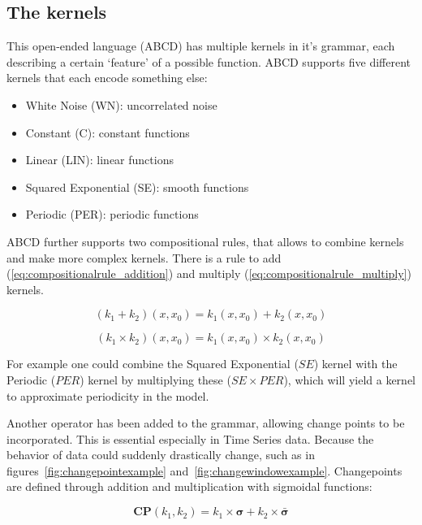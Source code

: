 \documentclass[a4paper, 10pt, conference]{ieeeconf}
\begin{document}
\subsection{The kernels}
\label{subsec:as:kernels}
This open-ended language (ABCD) has multiple kernels in it's grammar, each describing a certain `feature' of a possible function. ABCD supports five different kernels that each encode something else:
\begin{itemize}
    \item White Noise (WN): uncorrelated noise
    \item Constant (C): constant functions
    \item Linear (LIN): linear functions
    \item Squared Exponential (SE): smooth functions
    \item Periodic (PER): periodic functions
\end{itemize}

ABCD further supports two compositional rules, that allows to combine kernels and make more complex kernels. There is a rule to add (\ref{eq:compositionalrule_addition}) and multiply (\ref{eq:compositionalrule_multiply}) kernels.

\begin{equation}
    \label{eq:compositionalrule_addition}
    (k_1 + k_2)(x, x_0) = k_1(x, x_0) + k_2(x, x_0)
\end{equation}

\begin{equation}
    \label{eq:compositionalrule_multiply}
    (k_1 \times k_2)(x, x_0) = k_1(x, x_0) \times k_2(x, x_0)
\end{equation}

For example one could combine the Squared Exponential ($SE$) kernel with the Periodic ($PER$) kernel by multiplying these ($SE \times PER$), which will yield a kernel to approximate periodicity in the model.

Another operator has been added to the grammar, allowing change points to be incorporated. This is essential especially in Time Series data. Because the behavior of data could suddenly drastically change, such as in figures~\ref{fig:changepointexample} and~\ref{fig:changewindowexample}.
Changepoints are defined through addition and multiplication with sigmoidal functions:


\begin{equation}
    \label{eq:changepoint_1}
    \boldsymbol{CP}(k_1, k_2) = k_1 \times \boldsymbol{\sigma} + k_2 \times \boldsymbol{\bar{\sigma}}
\end{equation}
\end{document}
